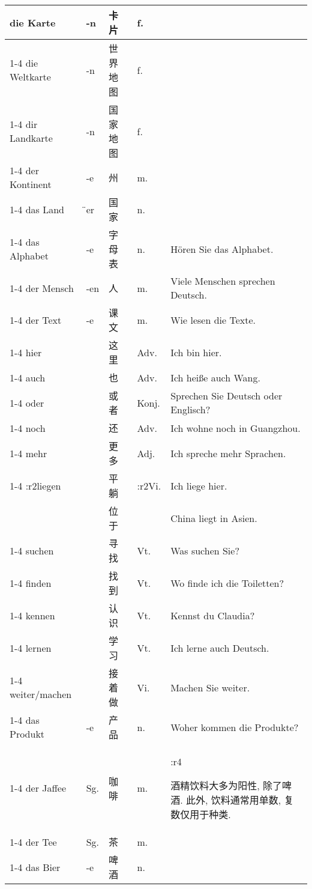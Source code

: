 \documentclass[hidelinks]{ctexart}
\newcommand{\gvocabcline}{\cline{1-4}}
\begin{document}
\begin{longtable}{lllll}
    die Karte & -n & 卡片 & f. \\
    \gvocabcline
    die Weltkarte & -n & 世界地图 & f. \\
    \gvocabcline
    dir Landkarte & -n & 国家地图 & f. \\
    \gvocabcline
    der Kontinent & -e & 州 & m. \\
    \gvocabcline
    das Land & \"{}er & 国家 & n. \\
    \gvocabcline
    das Alphabet & -e & 字母表 & n. & H\"oren Sie das Alphabet. \\
    \gvocabcline
    der Mensch & -en & 人 & m. & Viele Menschen sprechen Deutsch. \\
    \gvocabcline
    der Text & -e & 课文 & m. & Wie lesen die Texte. \\
    \gvocabcline
    hier & & 这里 & Adv. & Ich bin hier. \\
    \gvocabcline
    auch & & 也 & Adv. & Ich hei\ss e auch Wang.\\
    \gvocabcline
    oder & & 或者 & Konj. & Sprechen Sie Deutsch oder Englisch? \\
    \gvocabcline
    noch & & 还 & Adv. & Ich wohne noch in Guangzhou.\\
    \gvocabcline
    mehr & & 更多 & Adj. & Ich spreche mehr Sprachen.\\
    \gvocabcline
    \+:r2{liegen} & & 平躺 & \+:r2{Vi.} & Ich liege hier. \\
    & & 位于 & & China liegt in Asien.\\
    \gvocabcline
    suchen & & 寻找 & Vt. & Was suchen Sie?\\
    \gvocabcline
    finden & & 找到 & Vt. & Wo finde ich die Toiletten?\\
    \gvocabcline
    kennen & & 认识 & Vt. & Kennst du Claudia?\\
    \gvocabcline
    lernen & & 学习 & Vt. & Ich lerne auch Deutsch. \\
    \gvocabcline
    weiter/machen & & 接着做 & Vi. & Machen Sie weiter.\\
    \gvocabcline
    das Produkt & -e & 产品 & n. & Woher kommen die Produkte? \\
    \gvocabcline
    der Jaffee & Sg. & 咖啡 & m. & \+:r4{\parbox{4cm}{酒精饮料大多为阳性, 除了啤酒. 此外, 饮料通常用单数, 复数仅用于种类.}} \\
    \gvocabcline
    der Tee & Sg. & 茶 & m. \\
    \gvocabcline
    das Bier & -e & 啤酒 & n. \\

\end{longtable}
\end{document}
